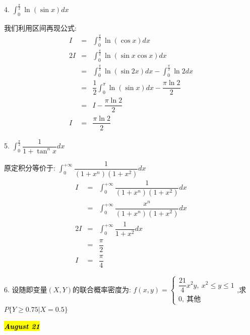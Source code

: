 4. $\int_{0}^{\frac{\pi}{2}}\ln(\sin x)dx$
\begin{solution}

	我们利用区间再现公式:  
	\begin{eqnarray*}
		I&=&\int_{0}^{\frac{\pi}{2}}\ln(\cos x)dx\\
		2I&=&\int_{0}^{\frac{\pi}{2}}\ln(\sin x\cos x)dx\\
		&=&\int_{0}^{\frac{\pi}{2}}\ln(\sin 2x)dx-\int_{0}^{\frac{\pi}{2}}\ln2dx\\
		&=&\dfrac{1}{2}\int_{0}^{\pi}\ln(\sin x)dx-\dfrac{\pi \ln 2}{2}\\
		&=&I-\dfrac{\pi \ln 2}{2}\\
		I&=&\dfrac{\pi \ln 2}{2}
	\end{eqnarray*}
\end{solution}

5. $\int_{0}^{\frac{\pi}{2}}\dfrac{1}{1+\tan^{n}x}dx$
\begin{solution}

	原定积分等价于:  $\int_{0}^{+\infty}\dfrac{1}{(1+x^{n})(1+x^2)}dx$
	\begin{eqnarray*}
		I&=&\int_{0}^{+\infty}\dfrac{1}{(1+x^{n})(1+x^2)}dx\\
		&=&\int_{0}^{+\infty}\dfrac{x^n}{(1+x^{n})(1+x^2)}dx\\
		2I&=&\int_{0}^{+\infty}\dfrac{1}{1+x^2}dx\\
		&=&\dfrac{\pi}{2}\\
		I&=&\dfrac{\pi}{4}
	\end{eqnarray*}
\end{solution}

6. 设随即变量$(X,Y)$的联合概率密度为:  $f(x,y)=\left\lbrace
\begin{array}{l}
	\dfrac{21}{4}x^2y,\ x^2\leq y\leq 1\\
	0,\ \text{其他}
\end{array}
\right. $,求$P\{Y\geq 0.75|X=0.5\}$
\begin{solution}
	
\end{solution}

\hl{\textbf{\textit{August 21}}}

